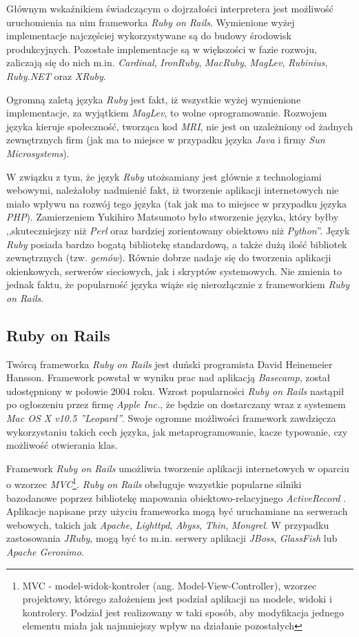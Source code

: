 \documentclass[a4paper,12pt]{article}
\begin{document}
Głównym wskaźnikiem świadczącym o dojrzałości interpretera jest
możliwość uruchomienia na nim frameworka \emph{Ruby on
  Rails}. Wymienione wyżej implementacje najczęściej wykorzystywane są
do budowy środowisk produkcyjnych. Pozostałe implementacje są w
większości w fazie rozwoju, zaliczają się do nich
m.in. \emph{Cardinal}, \emph{IronRuby}, \emph{MacRuby}, \emph{MagLev},
\emph{Rubinius}, \emph{Ruby.NET} oraz \emph{XRuby}.

Ogromną zaletą języka \emph{Ruby} jest fakt, iż wszystkie wyżej
wymienione implementacje, za wyjątkiem \emph{MagLev}, to wolne
oprogramowanie. Rozwojem języka kieruje społeczność, tworząca kod
\emph{MRI}, nie jest on uzależniony od żadnych zewnętrznych firm (jak
ma to miejsce w przypadku języka \emph{Java} i firmy \emph{Sun
  Microsystems}).

W związku z tym, że język \emph{Ruby} utożsamiany jest głównie z
technologiami webowymi, należałoby nadmienić fakt, iż tworzenie
aplikacji internetowych nie miało wpływu na rozwój tego języka (tak
jak ma to miejsce w przypadku języka \emph{PHP}). Zamierzeniem
Yukihiro Matsumoto było stworzenie języka, który byłby
,,skuteczniejszy niż \emph{Perl} oraz bardziej zorientowany obiektowo
niż \emph{Python}''\cite{matzinterview}. Język \emph{Ruby} posiada
bardzo bogatą bibliotekę standardową, a także dużą ilość bibliotek
zewnętrznych (tzw. \emph{gemów}). Równie dobrze nadaje się do
tworzenia aplikacji okienkowych, serwerów sieciowych, jak i skryptów
systemowych. Nie zmienia to jednak faktu, że popularność języka wiąże
się nierozłącznie z frameworkiem \emph{Ruby on Rails}.

\subsection{Ruby on Rails}
Twórcą frameworka \emph{Ruby on Rails} jest duński programista David
Heinemeier Hansson. Framework powstał w wyniku prac nad aplikacją
\emph{Basecamp}, został udostępniony w połowie 2004 roku. Wzrost
popularności \emph{Ruby on Rails} nastąpił po ogłoszeniu przez firmę
\emph{Apple Inc.}, że będzie on dostarczany wraz z systemem \emph{Mac
  OS X v10.5 ''Leopard''}\cite{rubyonrails}. Swoje ogromne możliwości
framework zawdzięcza wykorzystaniu takich cech języka, jak
metaprogramowanie, kacze typowanie, czy możliwość otwierania klas.

Framework \emph{Ruby on Rails} umożliwia tworzenie aplikacji
internetowych w oparciu o wzorzec \emph{MVC}\footnote{MVC -
  model-widok-kontroler (ang. Model-View-Controller), wzorzec
  projektowy, którego założeniem jest podział aplikacji na modele,
  widoki i kontrolery. Podział jest realizowany w taki sposób, aby
  modyfikacja jednego elementu miała jak najmniejszy wpływ na
  działanie pozostałych\cite{mvc}}. \emph{Ruby on Rails} obsługuje
wszystkie popularne silniki bazodanowe poprzez bibliotekę mapowania
obiektowo-relacyjnego \emph{ActiveRecord} \cite{orm}. Aplikacje
napisane przy użyciu frameworka mogą być uruchamiane na serwerach
webowych, takich jak \emph{Apache}, \emph{Lighttpd}, \emph{Abyss},
\emph{Thin}, \emph{Mongrel}. W przypadku zastosowania \emph{JRuby},
mogą być to m.in. serwery aplikacji \emph{JBoss}, \emph{GlassFish} lub
\emph{Apache Geronimo}.
\end{document}
